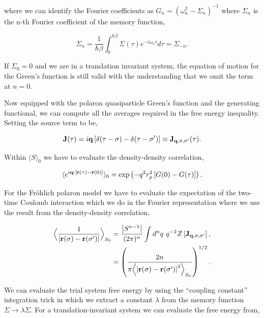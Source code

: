 where we can identify the Fourier coefficients as $G_n = (\omega^2_n - \Sigma_n)^{-1}$ where $\Sigma_n$ is the n-th Fourier coefficient of the memory function,

\begin{equation}
    \Sigma_n = \frac{1}{\hbar\beta} \int_0^{\hbar\beta} \Sigma(\tau) e^{-i\omega_n \tau} d\tau = \Sigma_{-n} .
\end{equation}

If $\Sigma_0 = 0$ and we are in a translation invariant system, the equation of motion for the Green's function is still valid with the understanding that we omit the term at $n = 0$.
\newline

Now equipped with the polaron quasiparticle Green's function and the generating functional, we can compute all the averages required in the free energy inequality. Setting the source term to be,

\begin{equation}
    \vb{J}(\tau) = i \vb{q} \left[ \delta(\tau - \sigma) - \delta(\tau - \sigma') \right] \equiv \vb{J}_{\vb{q}, \sigma, \sigma'}(\tau).
\end{equation}

Within $\langle S \rangle_{0}$ we have to evaluate the density-density correlation,

\begin{equation}
    \langle e^{i \vb{q} \cdot \left[ \vb{r}(\tau) - \vb{r}(0) \right]}\rangle_0  = \exp \left( -q^2 r_p^2 \left[ G(0) - G(\tau) \right] \right).
\end{equation}

For the Fr\"ohlich polaron model we have to evaluate the expectation of the two-time Coulomb interaction which we do in the Fourier representation where we use the result from the density-density correlation,

\begin{equation}
    \begin{aligned}
        \Big\langle \frac{1}{\abs{\vb{r}(\sigma) - \vb{r}(\sigma')}} \Big\rangle_{S_0} &= \frac{\abs{S^{n-1}}}{(2\pi)^n} \int d^n q\ q^{-2} Z\left[ \vb{J}_{\vb{q}, \sigma, \sigma'} \right], \\
        &= \left(\frac{2 n}{\pi \Big\langle \abs{\vb{r}(\sigma) - \vb{r}(\sigma')}^2 \Big\rangle_{S_0}}\right)^{1/2}.
    \end{aligned}
\end{equation}

We can evaluate the trial system free energy by using the ``coupling constant'' integration trick in which we extract a constant $\lambda$ from the memory function $\Sigma \to \lambda \Sigma$. For a translation-invariant system we can evaluate the free energy from,

